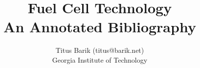 \documentclass [11pt]{article}
\title{Fuel Cell Technology\\\medskip An Annotated Bibliography}
\author{Titus Barik (titus@barik.net)\\Georgia Institute of Technology}
\begin{document}
\maketitle
\nocite{*}


\end{document}
